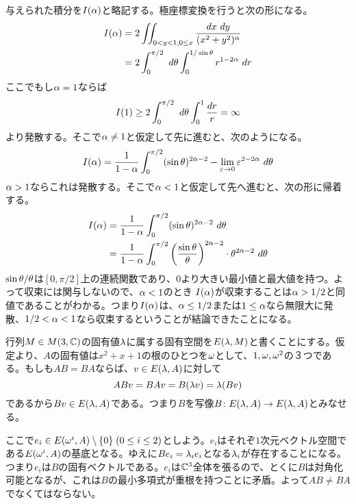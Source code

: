 
\begin{sol}
与えられた積分を$I({\alpha})$と略記する。極座標変換を行うと次の形になる。
\begin{align*}
  I({\alpha}) &= 2 \iint_{0 < y < 1, 0 \leq x} \frac{dx \ dy}{(x^2 + y^2)^{{\alpha}} } \\
  &= 2 \int_0^{\pi /2} \ d{\theta} \int_0^{1/ \sin {\theta}} r^{1 - 2 {\alpha}} \ dr
\end{align*}
ここでもし${\alpha} = 1$ならば
\[
I(1) \geq 2 \int_0^{\pi /2} \ d{\theta} \int_0^1 \frac{dr}{r} = \infty
\]
より発散する。そこで${\alpha} \neq 1$と仮定して先に進むと、次のようになる。
\[
I({\alpha}) = \frac{1}{1- {\alpha}} \int_0^{\pi /2} (\sin {\theta})^{2{\alpha} - 2} - \lim_{{\varepsilon} \to 0} {\varepsilon}^{2 - 2{\alpha}} \ d{\theta}
\]
${\alpha} > 1$ならこれは発散する。そこで${\alpha} < 1$と仮定して先へ進むと、次の形に帰着する。
\begin{align*}
  I({\alpha}) &=  \frac{1}{1- {\alpha}} \int_0^{\pi /2}  (\sin {\theta})^{2{\alpha} - 2} \ d{\theta} \\
  &= \frac{1}{1- {\alpha}} \int_0^{\pi /2}  \left( \frac{\sin {\theta}}{{\theta}} \right)^{2{\alpha} - 2} \cdot {\theta}^{2{\alpha} - 2} \ d{\theta} \\
\end{align*}
$\sin {\theta} / {\theta}$は$[0, \pi/2]$上の連続関数であり、$0$より大きい最小値と最大値を持つ。よって収束には関与しないので、${\alpha} < 1$のとき
$I({\alpha})$が収束することは${\alpha} > 1/2$と同値であることがわかる。つまり$I({\alpha})$は、${\alpha} \leq 1/2$または$1 \leq {\alpha}$なら無限大に発散、$1/2 < {\alpha} < 1$なら収束するということが結論できたことになる。
\end{sol}

\newpage


\begin{sol}
  行列$M \in M(3,{\mathbb C})$の固有値${\lambda}$に属する固有空間を$E({\lambda}, M)$と書くことにする。仮定より、$A$の固有値は$x^2 + x + 1$の根のひとつを${\omega}$として、$1,{\omega}, {\omega}^2$の３つである。もしも$AB =BA$ならば、$v \in E({\lambda},A)$に対して
  \[
AB v = BA v = B({\lambda} v) = {\lambda} (B v)
  \]
  であるから$Bv \in E({\lambda},A)$である。つまり$B$を写像$B \colon E({\lambda},A) \to E({\lambda},A)$とみなせる。

  ここで$e_i \in E({\omega}^i,A) \setminus \{ 0 \} \; (0 \leq i \leq 2)$としよう。$e_i$はそれぞ$1$次元ベクトル空間である$E({\omega}^i,A)$の基底となる。ゆえに$B e_i = {\lambda}_i e_i$となる${\lambda}_i$が存在することになる。つまり$e_i$は$B$の固有ベクトルである。$e_i$は${\mathbb C}^3$全体を張るので、とくに$B$は対角化可能となるが、これは$B$の最小多項式が重根を持つことに矛盾。よって$AB \neq BA$でなくてはならない。
\end{sol}
\newpage


